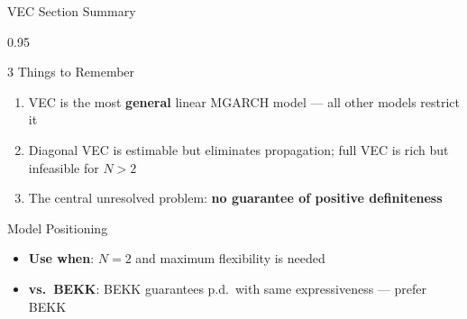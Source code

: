 \documentclass[9pt, aspectratio=169, t]{beamer}
\begin{document}
\begin{frame}{VEC Section Summary}
    \begin{cminipage}{0.95\textwidth}
    {\footnotesize
    \begin{block}{3 Things to Remember}
        \begin{enumerate}\setlength{\itemsep}{2pt}
            \item VEC is the most \textbf{general} linear MGARCH model --- all other models restrict it
            \item Diagonal VEC is estimable but eliminates propagation; full VEC is rich but infeasible for $N > 2$
            \item The central unresolved problem: \textbf{no guarantee of positive definiteness}
        \end{enumerate}
    \end{block}
    \begin{alertblock}{Model Positioning}
        \begin{itemize}\setlength{\itemsep}{0pt}
            \item \textbf{Use when}: $N = 2$ and maximum flexibility is needed
            \item \textbf{vs.\ BEKK}: BEKK guarantees p.d.\ with same expressiveness --- prefer BEKK
        \end{itemize}
    \end{alertblock}
    }
    \end{cminipage}
\end{frame}

\end{document}
